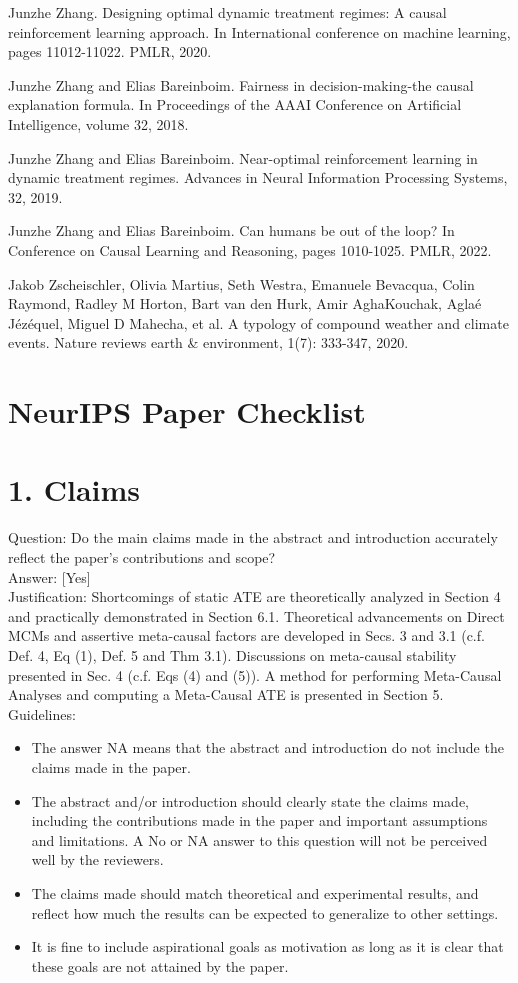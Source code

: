 \documentclass[10pt]{article}
\begin{document}
Junzhe Zhang. Designing optimal dynamic treatment regimes: A causal reinforcement learning approach. In International conference on machine learning, pages 11012-11022. PMLR, 2020.

Junzhe Zhang and Elias Bareinboim. Fairness in decision-making-the causal explanation formula. In Proceedings of the AAAI Conference on Artificial Intelligence, volume 32, 2018.

Junzhe Zhang and Elias Bareinboim. Near-optimal reinforcement learning in dynamic treatment regimes. Advances in Neural Information Processing Systems, 32, 2019.

Junzhe Zhang and Elias Bareinboim. Can humans be out of the loop? In Conference on Causal Learning and Reasoning, pages 1010-1025. PMLR, 2022.

Jakob Zscheischler, Olivia Martius, Seth Westra, Emanuele Bevacqua, Colin Raymond, Radley M Horton, Bart van den Hurk, Amir AghaKouchak, Aglaé Jézéquel, Miguel D Mahecha, et al. A typology of compound weather and climate events. Nature reviews earth \& environment, 1(7): 333-347, 2020.

\section*{NeurIPS Paper Checklist}
\section*{1. Claims}
Question: Do the main claims made in the abstract and introduction accurately reflect the paper's contributions and scope?\\[0pt]
Answer: [Yes]\\
Justification: Shortcomings of static ATE are theoretically analyzed in Section 4 and practically demonstrated in Section 6.1. Theoretical advancements on Direct MCMs and assertive meta-causal factors are developed in Secs. 3 and 3.1 (c.f. Def. 4, Eq (1), Def. 5 and Thm 3.1). Discussions on meta-causal stability presented in Sec. 4 (c.f. Eqs (4) and (5)). A method for performing Meta-Causal Analyses and computing a Meta-Causal ATE is presented in Section 5.\\
Guidelines:

\begin{itemize}
  \item The answer NA means that the abstract and introduction do not include the claims made in the paper.
  \item The abstract and/or introduction should clearly state the claims made, including the contributions made in the paper and important assumptions and limitations. A No or NA answer to this question will not be perceived well by the reviewers.
  \item The claims made should match theoretical and experimental results, and reflect how much the results can be expected to generalize to other settings.
  \item It is fine to include aspirational goals as motivation as long as it is clear that these goals are not attained by the paper.
\end{itemize}
\end{document}
